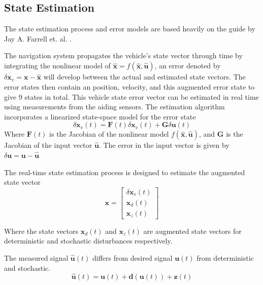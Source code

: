 \documentclass{article}
\begin{document}
\subsection{State Estimation}

The state estimation process and error models are based heavily on the guide by Jay A. Farrell et. al. \cite{error_modelling}.

The navigation system propagates the vehicle's
state vector through time by integrating the nonlinear
model of $\dot{\hat{\mathbf{x}}} = f(\hat{\mathbf{x}}, \hat{\mathbf{u}})$, an error denoted by $\delta\mathbf{x}_v = \mathbf{x} - \hat{\mathbf{x}}$ will
develop between the actual and estimated state vectors.
The error states then contain an position, velocity, and this augmented error state to give 9 states in total.
This vehicle state error vector can
be estimated in real time using measurements from the
aiding sensors.
The estimation algorithm incorporates a linearized state-space model for
the error state
\begin{equation}
    \delta \dot{\mathbf{x}}_v(t) =  \mathbf{F}(t) \delta \mathbf{x}_v(t) + \mathbf{G} \delta \mathbf{u}(t)
\end{equation}
Where $\mathbf{F}(t)$ is the Jacobian of the nonlinear model $f(\hat{\mathbf{x}}, \hat{\mathbf{u}})$, and $\mathbf{G}$ is the Jacobian of the input vector $\hat{\mathbf{u}}$.
The error in the input vector is given by $\delta\mathbf{u} = \mathbf{u} - \hat{\mathbf{u}}$

The real-time state estimation process is designed to
estimate the augmented state vector
\begin{equation}
    \mathbf{x} = \begin{bmatrix}
        \delta \mathbf{x}_v(t) \\
        \mathbf{x}_d(t) \\
        \mathbf{x}_z(t)
    \end{bmatrix}
\end{equation}

Where the state vectors $\mathbf{x}_d(t)$ and $\mathbf{x}_z(t)$ are augmented state vectors for deterministic and stochastic disturbances respectively.

The measured signal $\hat{\mathbf{u}}(t)$ differs from desired signal $\mathbf{u}(t)$ from deterministic and stochastic.
\begin{equation}
    \hat{\mathbf{u}}(t) = \mathbf{u}(t) + \mathbf{d}(\mathbf{u}(t)) + \mathbf{z}(t)    
\end{equation}
\end{document}
